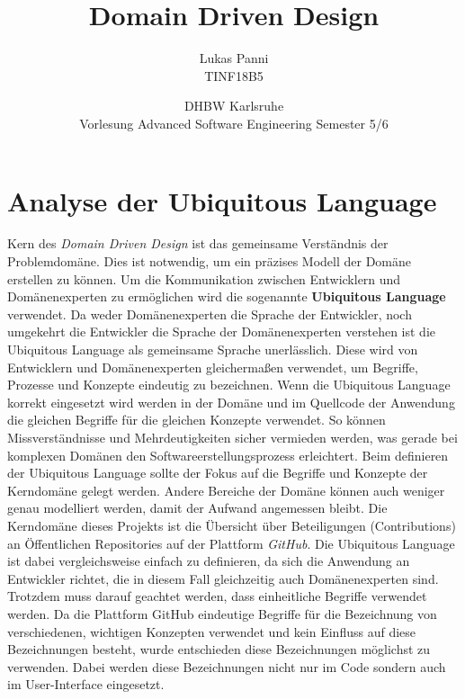 \documentclass[12pt]{article}
\title{Domain Driven Design}
\date{DHBW Karlsruhe\\ Vorlesung Advanced Software Engineering Semester 5/6}
\author{Lukas Panni \\ TINF18B5}
\begin{document}
\maketitle

\newpage
\tableofcontents
\newpage

\section{Analyse der Ubiquitous Language}

Kern des \textit{Domain Driven Design} ist das gemeinsame Verständnis der Problemdomäne. Dies ist notwendig, um ein präzises Modell der Domäne erstellen zu können.
Um die Kommunikation zwischen Entwicklern und Domänenexperten zu ermöglichen wird die sogenannte \textbf{Ubiquitous  Language} verwendet.
Da weder Domänenexperten die Sprache der Entwickler, noch umgekehrt die Entwickler die Sprache der Domänenexperten verstehen ist die Ubiquitous Language als gemeinsame Sprache unerlässlich.
Diese wird von Entwicklern und Domänenexperten gleichermaßen verwendet, um Begriffe, Prozesse und Konzepte eindeutig zu bezeichnen.
Wenn die Ubiquitous Language korrekt eingesetzt wird werden in der Domäne und im Quellcode der Anwendung die gleichen Begriffe für die gleichen Konzepte verwendet.
So können Missverständnisse und Mehrdeutigkeiten sicher vermieden werden, was gerade bei komplexen Domänen den Softwareerstellungsprozess erleichtert.
Beim definieren der Ubiquitous Language sollte der Fokus auf die Begriffe und Konzepte der Kerndomäne gelegt werden.
Andere Bereiche der Domäne können auch weniger genau modelliert werden, damit der Aufwand angemessen bleibt.
\newline
\newline
Die Kerndomäne dieses Projekts ist die Übersicht über Beteiligungen (Contributions) an Öffentlichen Repositories auf der Plattform \textit{GitHub}.
Die Ubiquitous Language ist dabei vergleichsweise einfach zu definieren, da sich die Anwendung an Entwickler richtet, die in diesem Fall gleichzeitig auch Domänenexperten sind.
Trotzdem muss darauf geachtet werden, dass einheitliche Begriffe verwendet werden.
Da die Plattform GitHub eindeutige Begriffe für die Bezeichnung von verschiedenen, wichtigen Konzepten verwendet und kein Einfluss auf diese Bezeichnungen besteht, wurde entschieden diese Bezeichnungen möglichst zu verwenden. Dabei werden diese Bezeichnungen nicht nur im Code sondern auch im User-Interface eingesetzt.
\end{document}

